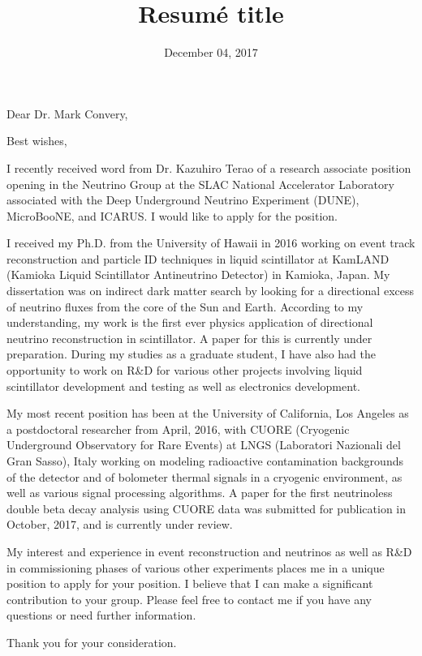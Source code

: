 \documentclass[11pt,a4paper,sans]{moderncv}        %
\title{Resumé title}                               %
\begin{document}
\date{December 04, 2017}
\opening{Dear Dr. Mark Convery,}
\closing{Best wishes,}
\makelettertitle

I recently received word from Dr. Kazuhiro Terao of a research associate
position opening in the Neutrino Group at the SLAC National Accelerator
Laboratory associated with the Deep Underground Neutrino Experiment (DUNE),
MicroBooNE, and ICARUS. I would like to apply for the position.

I received my Ph.D. from the University of Hawaii in 2016 working on event track
reconstruction and particle ID techniques in liquid scintillator at KamLAND
(Kamioka Liquid Scintillator Antineutrino Detector) in Kamioka, Japan. My
dissertation was on indirect dark matter search by looking for a directional
excess of neutrino fluxes from the core of the Sun and Earth. According to my
understanding, my work is the first ever physics application of directional
neutrino reconstruction in scintillator. A paper for this is currently under
preparation. During my studies as a graduate student, I have also had the opportunity to work on R\&D for various other projects involving liquid scintillator development and testing as well as electronics development.

My most recent position has been at the University of California, Los Angeles
as a postdoctoral researcher from April, 2016, with CUORE (Cryogenic
Underground Observatory for Rare Events)  at LNGS (Laboratori Nazionali del Gran
Sasso), Italy working on modeling radioactive contamination backgrounds of the
detector and of bolometer thermal signals in a cryogenic environment, as well
as various signal processing algorithms. A paper for the first neutrinoless
double beta decay analysis using CUORE data was submitted for publication in
October, 2017, and is currently under review.

My interest and experience in event reconstruction and neutrinos as well as
R\&D in commissioning phases of various other experiments places me in a unique
position to apply for your position. I believe that I can make a significant
contribution to your group. Please feel free to contact me if you have any
questions or need further information.

Thank you for your consideration.

\makeletterclosing
\end{document}
